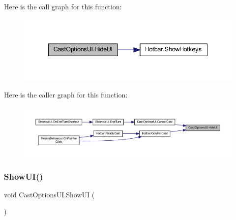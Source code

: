 Here is the call graph for this function\+:\nopagebreak
\begin{figure}[H]
\begin{center}
\leavevmode
\includegraphics[width=335pt]{class_cast_options_u_i_affc98e48b03c51f4dddda5cb96920697_cgraph}
\end{center}
\end{figure}
Here is the caller graph for this function\+:\nopagebreak
\begin{figure}[H]
\begin{center}
\leavevmode
\includegraphics[width=350pt]{class_cast_options_u_i_affc98e48b03c51f4dddda5cb96920697_icgraph}
\end{center}
\end{figure}
\mbox{\label{class_cast_options_u_i_a37c4fa85c666ede5418cd5d7e524ce35}} 
\subsubsection{\texorpdfstring{ShowUI()}{ShowUI()}}
{\footnotesize\ttfamily void Cast\+Options\+U\+I.\+Show\+UI (\begin{DoxyParamCaption}{ }\end{DoxyParamCaption})}

